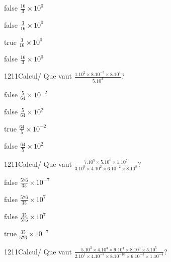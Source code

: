 \documentclass[11pt]{article}
\begin{document}
            \begin{reponses}
                \item[false] $\frac{16}{3}\times 10^{0}$
                \item[false] $\frac{3}{16}\times 10^{0}$
                \item[true] $\frac{3}{16}\times 10^{0}$
                \item[false] $\frac{16}{3}\times 10^{0}$
            \end{reponses}
            
            \begin{question}{1211}{Calcul}{}{/}
                Que vaut $\frac{1.10^{2}\times 8.10^{-5}\times 8.10^{4}}{5.10^{3}}$?
            \end{question}
            
            \begin{reponses}
                \item[false] $\frac{5}{64}\times 10^{-2}$
                \item[false] $\frac{5}{64}\times 10^{2}$
                \item[true] $\frac{64}{5}\times 10^{-2}$
                \item[false] $\frac{64}{5}\times 10^{2}$
            \end{reponses}
            
            \begin{question}{1211}{Calcul}{}{/}
                Que vaut $\frac{7.10^{5}\times 5.10^{0}\times 1.10^{5}}{3.10^{9}\times 4.10^{2}\times 6.10^{-2}\times 8.10^{8}}$?
            \end{question}
            
            \begin{reponses}
                \item[false] $\frac{576}{35}\times 10^{-7}$
                \item[false] $\frac{576}{35}\times 10^{7}$
                \item[false] $\frac{35}{576}\times 10^{7}$
                \item[true] $\frac{35}{576}\times 10^{-7}$
            \end{reponses}
            
            \begin{question}{1211}{Calcul}{}{/}
                Que vaut $\frac{5.10^{3}\times 4.10^{3}\times 9.10^{4}\times 8.10^{3}\times 5.10^{5}}{2.10^{1}\times 4.10^{-8}\times 8.10^{-10}\times 6.10^{-3}\times 1.10^{-4}}$?
            \end{question}
            
\end{document}
